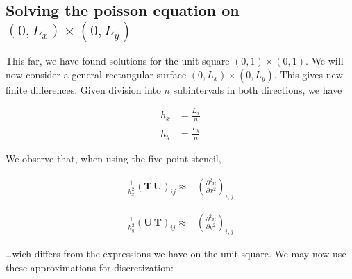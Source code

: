 
\subsection{Solving the poisson equation on $(0, L_x) \times (0,L_y)$}
This far, we have found solutions for the unit square $(0, 1) \times (0,1)$. We will now consider a general rectangular surface $(0, L_x) \times (0,L_y)$. This gives new finite differences. Given division into $n$ subintervals in both directions, we have






\begin{align}
h_x &= \frac{L_x}{n} \\
h_y &= \frac{L_y}{n}
\end{align}

We observe that, when using the five point stencil, 

\begin{align}
  \frac{1}{h_x^2} (\mathbf{{T}} \, \mathbf{{U}})_{ij} \approx -\left( \frac{\partial^2 u}{\partial x^2} \right)_{i,j}
\end{align}

\begin{align}
  \frac{1}{h_y^2} (\mathbf{{U}} \, \mathbf{{T}})_{ij} \approx -\left( \frac{\partial^2 u}{\partial y^2} \right)_{i,j}
\end{align}

\ldots wich differs from the expressions we have on the unit square. We may now use these approximations for discretization:

